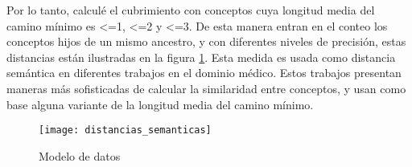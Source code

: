 Por lo tanto, calculé el cubrimiento con conceptos cuya longitud media del camino mínimo es \textless=1, \textless=2 y \textless=3. De esta manera entran en el conteo los conceptos hijos de un mismo ancestro, y con diferentes niveles de precisión, estas distancias están ilustradas en la figura \ref{fig:distancias_semanticas}. Esta medida es usada como distancia semántica en diferentes trabajos en el dominio médico\cite{Wang2010,Gan2013,Pedersen2007,Zare2015ASNOMED-CT}. Estos trabajos presentan maneras más sofisticadas de calcular la similaridad entre conceptos, y usan como base alguna variante de la longitud media del camino mínimo.

\begin{figure}[ht]
\caption{Modelo de datos}
\label{fig:distancias_semanticas}
\centering
\texttt{[image: distancias\_semanticas]}
\end{figure}

